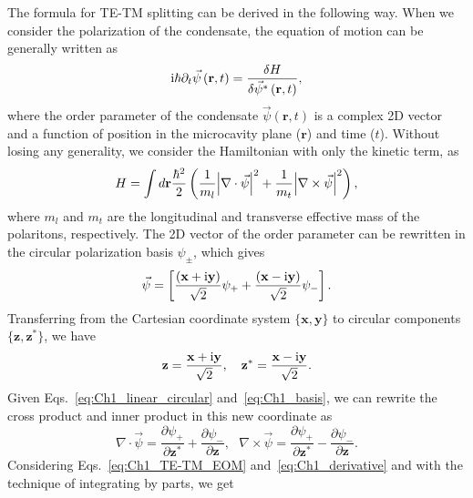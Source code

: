 The formula for TE-TM splitting can be derived in the following way.
When we consider the polarization of the condensate, the equation of motion can be generally written as
%
\begin{equation}
    \mathrm{i}\hbar \partial_t \vec{\psi}\left( \mathbf{r},t\right) = \frac{\delta H}{\delta \vec{\psi}^* \left( \mathbf{r},t\right)},
    \label{eq:Ch1_TE-TM_EOM}
\end{equation}
%
where the order parameter of the condensate $\vec{\psi}\left(\mathbf{r},t \right)$ is a complex 2D vector and a function of position in the microcavity plane ($\mathbf{r}$) and time ($t$).
Without losing any generality, we consider the Hamiltonian with only the kinetic term, as~\cite{Rubo2013}
%
\begin{equation}
    H = \int d\mathbf{r} \frac{\hbar^2}{2}\left( \frac{1}{m_l} \abs{\nabla \cdot \vec{\psi}}^2 + \frac{1}{m_t} \abs{\nabla \times \vec{\psi}}^2\right),
    \label{eq:Ch1_TE-TM_effect_mass}
\end{equation}
%
where $m_l$ and $m_t$ are the longitudinal and transverse effective mass of the polaritons, respectively.
The 2D vector of the order parameter can be rewritten in the circular polarization basis $\psi_\pm$, which gives
%
\begin{equation}
    \vec{\psi} =  \left[ \frac{\left(\mathbf{x}+\mathrm{i}\mathbf{y} \right)}{\sqrt{2}}\psi_+ +\frac{\left( \mathbf{x}-\mathrm{i}\mathbf{y}\right)}{\sqrt{2}}\psi_-\right].
    \label{eq:Ch1_linear_circular}
\end{equation}
%
Transferring from the Cartesian coordinate system $\{\mathbf{x},\mathbf{y}\} $ to circular components $\{ \mathbf{z},\mathbf{z}^*\}$, we have
%
\begin{equation}
    \mathbf{z} = \frac{\mathbf{x}+\mathrm{i}\mathbf{y}}{\sqrt{2}}, ~ ~ ~ \mathbf{z}^* = \frac{\mathbf{x}-\mathrm{i}\mathbf{y}}{\sqrt{2 }}.
    \label{eq:Ch1_basis}
\end{equation}
%
Given Eqs.~\eqref{eq:Ch1_linear_circular} and~\eqref{eq:Ch1_basis}, we can rewrite the cross product and inner product in this new coordinate as
%
\begin{equation}
    \nabla \cdot \vec{\psi} = \frac{\partial \psi_+}{\partial \mathbf{z}^*}+ \frac{\partial \psi_-}{\partial \mathbf{z}}, ~ ~ ~ \nabla \times \vec{\psi} = \frac{\partial \psi_+}{\partial \mathbf{z}^*} - \frac{\partial \psi_-}{\partial \mathbf{z}}.
    \label{eq:Ch1_derivative}
\end{equation}
%
Considering Eqs.~\eqref{eq:Ch1_TE-TM_EOM} and~\eqref{eq:Ch1_derivative} and with the technique of integrating by parts, we get
